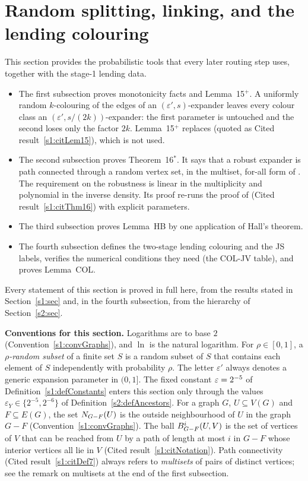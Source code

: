 \section{Random splitting, linking, and the lending colouring}\label{s3:sec}

This section provides the probabilistic tools that every later routing step
uses, together with the stage-1 lending data.
\begin{itemize}
\item The first subsection proves monotonicity facts and
  Lemma~15$^+$. A uniformly random $k$-colouring of the edges of an
  $(\varepsilon',s)$-expander leaves every colour class an
  $(\varepsilon',s/(2k))$-expander: the first parameter is untouched and
  the second loses only the factor $2k$. Lemma~15$^+$ replaces
  \cite[Lemma~15]{BM} (quoted as Cited result~\ref{s1:citLem15}), which is not
  used.
\item The second subsection proves Theorem~16$^*$. It says that a
  robust expander is path connected through a random vertex set, in the
  multiset, for-all form of \cite[Definition~7]{BM}. The requirement on
  the robustness is linear in the multiplicity and polynomial in the
  inverse density. Its proof re-runs the proof of \cite[Theorem~16]{BM}
  (Cited result~\ref{s1:citThm16}) with explicit parameters.
\item The third subsection proves Lemma~HB by one application of Hall's
  theorem.
\item The fourth subsection defines the two-stage lending colouring
  and the JS labels, verifies the numerical conditions they need (the
  COL-JV table), and proves Lemma~COL.
\end{itemize}
Every statement of this section is proved in full here, from the results
stated in Section~\ref{s1:sec} and, in the fourth subsection, from the hierarchy of
Section~\ref{s2:sec}.

\medskip\noindent\textbf{Conventions for this section.} Logarithms are to
base $2$ (Convention~\ref{s1:convGraphs}), and $\ln$ is the natural
logarithm. For $\rho\in[0,1]$, a \emph{$\rho$-random subset} of a finite
set $S$ is a random subset of $S$ that contains each element of $S$
independently with probability $\rho$. The letter $\varepsilon'$ always
denotes a generic expansion parameter in $(0,1]$. The fixed constant
$\varepsilon=2^{-5}$ of Definition~\ref{s1:defConstants} enters this section only
through the values $\varepsilon_Y\in\{2^{-5},2^{-6}\}$ of
Definition~\ref{s2:defAncestors}. For a graph $G$, $U\subseteq V(G)$ and
$F\subseteq E(G)$, the set $N_{G-F}(U)$ is the outside neighbourhood of
$U$ in the graph $G-F$ (Convention~\ref{s1:convGraphs}). The ball
$B^{i}_{G-F}(U,V)$ is the set of vertices of $V$ that can be reached
from $U$ by a path of length at most $i$ in $G-F$ whose interior vertices
all lie in $V$ (Cited result~\ref{s1:citNotation}). Path connectivity
(Cited result~\ref{s1:citDef7}) always refers to \emph{multisets} of pairs of
distinct vertices; see the remark on multisets at the end of the first subsection.

